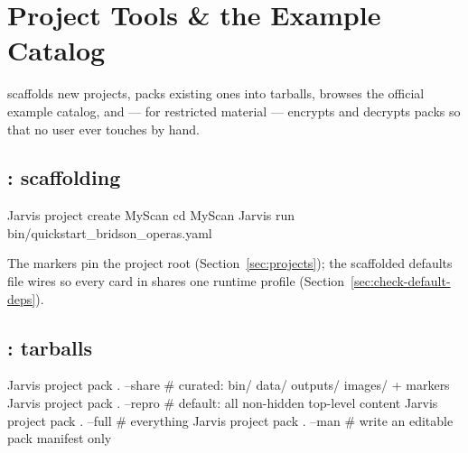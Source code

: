 \chapter{Project Tools \& the Example Catalog}
\label{ch:project-cli}

  scaffolds new
projects, packs existing ones into tarballs, browses the official example catalog, and
--- for restricted material --- encrypts and decrypts packs so that no user ever touches
 by hand.

\section{: scaffolding}
\label{sec:project-create}

\begin{terminal}
\begin{jcmd}
Jarvis project create MyScan
cd MyScan
Jarvis run bin/quickstart_bridson_operas.yaml
\end{jcmd}
\end{terminal}

\begin{jfiletree}
\end{jfiletree}

The markers pin the project root (Section~\ref{sec:projects}); the scaffolded defaults
file wires  so every card in 
shares one runtime profile (Section~\ref{sec:check-default-deps}).

\section{: tarballs}
\label{sec:project-pack}

\begin{terminal}
\begin{jcmd}
Jarvis project pack . --share    # curated: bin/ data/ outputs/ images/ + markers
Jarvis project pack . --repro    # default: all non-hidden top-level content
Jarvis project pack . --full     # everything
Jarvis project pack . --man      # write an editable pack manifest only
\end{jcmd}
\end{terminal}

